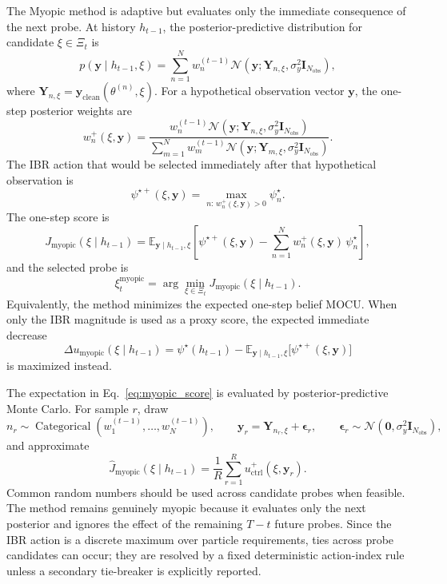 \documentclass[11pt]{article}
\begin{document}
The Myopic method is adaptive but evaluates only the immediate consequence of the next probe. At history \(h_{t-1}\), the posterior-predictive distribution for candidate \(\xi\in\Xi_t\) is
\[
\boxed{
p(\mathbf y\mid h_{t-1},\xi)
=
\sum_{n=1}^{N}
w_n^{(t-1)}
\mathcal N\!\left(
\mathbf y;\mathbf Y_{n,\xi},
\sigma_y^2\mathbf I_{N_{\mathrm{obs}}}
\right),
}
\label{eq:predictive_y}
\]
where
\(\mathbf Y_{n,\xi}=\mathbf y_{\mathrm{clean}}(\theta^{(n)},\xi)\).
For a hypothetical observation vector \(\mathbf y\), the one-step posterior
weights are
\[
w_n^{+}(\xi,\mathbf y)
=
\frac{
w_n^{(t-1)}
\mathcal N\!\left(
\mathbf y;\mathbf Y_{n,\xi},
\sigma_y^2\mathbf I_{N_{\mathrm{obs}}}
\right)
}{
\sum_{m=1}^{N}
w_m^{(t-1)}
\mathcal N\!\left(
\mathbf y;\mathbf Y_{m,\xi},
\sigma_y^2\mathbf I_{N_{\mathrm{obs}}}
\right)
}.
\]
The IBR action that would be selected immediately after that hypothetical observation is
\[
\psi^{\star+}(\xi,\mathbf y)
=
\max_{n:\,w_n^{+}(\xi,\mathbf y)>0}\psi_n^\star.
\]
The one-step score is
\[
\boxed{
J_{\mathrm{myopic}}(\xi\mid h_{t-1})
=
\mathbb E_{\mathbf y\mid h_{t-1},\xi}
\left[
\psi^{\star+}(\xi,\mathbf y)
-
\sum_{n=1}^{N}
w_n^{+}(\xi,\mathbf y)\,\psi_n^\star
\right],
}
\label{eq:myopic_score}
\]
and the selected probe is
\[
\boxed{
\xi_t^{\mathrm{myopic}}
=
\arg\min_{\xi\in\Xi_t}
J_{\mathrm{myopic}}(\xi\mid h_{t-1}).
}
\label{eq:myopic_action}
\]
Equivalently, the method minimizes the expected one-step belief MOCU. When
only the IBR magnitude is used as a proxy score, the expected immediate decrease
\[
\Delta u_{\mathrm{myopic}}(\xi\mid h_{t-1})
=
\psi^\star(h_{t-1})
-
\mathbb E_{\mathbf y\mid h_{t-1},\xi}
\bigl[
\psi^{\star+}(\xi,\mathbf y)
\bigr]
\]
is maximized instead.

The expectation in Eq.~\eqref{eq:myopic_score} is evaluated by posterior-predictive Monte Carlo. For sample \(r\), draw
\[
n_r\sim\operatorname{Categorical}
\left(w_1^{(t-1)},\ldots,w_N^{(t-1)}\right),
\qquad
\mathbf y_r=\mathbf Y_{n_r,\xi}+\boldsymbol\epsilon_r,
\qquad
\boldsymbol\epsilon_r
\sim
\mathcal N\!\left(
\mathbf 0,\sigma_y^2\mathbf I_{N_{\mathrm{obs}}}
\right),
\]
and approximate
\[
\widehat J_{\mathrm{myopic}}(\xi\mid h_{t-1})
=
\frac{1}{R}
\sum_{r=1}^{R}
u_{\mathrm{ctrl}}^{+}(\xi,\mathbf y_r).
\]
Common random numbers should be used across candidate probes when feasible. The method remains genuinely myopic because it evaluates only the next posterior and ignores the effect of the remaining \(T-t\) future probes. Since the IBR action is a discrete maximum over particle requirements, ties across probe candidates can occur; they are resolved by a fixed deterministic action-index rule unless a secondary tie-breaker is explicitly reported.
\end{document}
